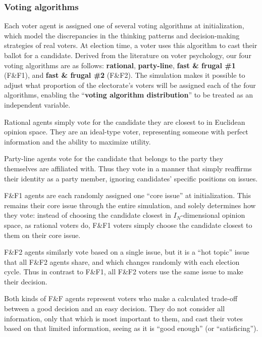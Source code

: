 \subsubsection{Voting algorithms}
\label{votingAlgorithms}


Each voter agent is assigned one of several voting algorithms at
initialization, which model the discrepancies in the thinking patterns and
decision-making strategies of real voters. At election time, a voter uses this
algorithm to cast their ballot for a candidate. Derived from the literature on
voter psychology\cite[ch.2]{redlawsk_citizens_2020}, our four voting algorithms
are as follows: \textbf{rational}, \textbf{party-line}, \textbf{fast \& frugal
\#1} (F\&F1), and \textbf{fast \& frugal \#2} (F\&F2). The simulation makes it
possible to adjust what proportion of the electorate's voters will be assigned
each of the four algorithms, enabling the ``\textbf{voting algorithm
distribution}'' to be treated as an independent variable.

Rational agents simply vote for the candidate they are closest to in Euclidean
opinion space. They are an ideal-type voter, representing someone with perfect
information and the ability to maximize utility.

Party-line agents vote for the candidate that belongs to the party they
themselves are affiliated with. Thus they vote in a manner that simply
reaffirms their identity as a party member, ignoring candidates' specific
positions on issues.

F\&F1 agents are each randomly assigned one ``core issue'' at initialization.
This remains their core issue through the entire simulation, and solely
determines how they vote: instead of choosing the candidate closest in
$I_N$-dimensional opinion space, as rational voters do, F\&F1 voters simply
choose the candidate closest to them on their core issue.

F\&F2 agents similarly vote based on a single issue, but it is a ``hot topic''
issue that all F\&F2 agents share, and which changes randomly with each
election cycle. Thus in contrast to F\&F1, all F\&F2 voters use the same issue
to make their decision.

Both kinds of F\&F agents represent voters who make a calculated trade-off
between a good decision and an easy decision. They do not consider all
information, only that which is most important to them, and cast their votes
based on that limited information, seeing as it is ``good enough'' (or
``satisficing''\cite{simon_rational_1956}).


